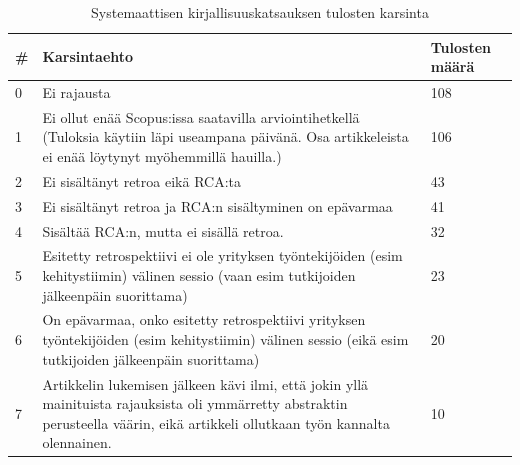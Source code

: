 \begin{table}
    \begin{tabular}{|p{0.5cm}|p{11.5cm}|p{2cm}|}
        \hline
        \textbf{\#} & \textbf{Karsintaehto} & \textbf{Tulosten määrä} \\ \hline
        0 & Ei rajausta                                                                                                                                               & 108            \\ \hline
        1 & Ei ollut enää Scopus:issa saatavilla arviointihetkellä (Tuloksia käytiin läpi useampana päivänä. Osa artikkeleista ei enää löytynyt myöhemmillä hauilla.) & 106            \\ \hline
        2 & Ei sisältänyt retroa eikä RCA:ta                                                                                                                          & 43             \\ \hline
        3 & Ei sisältänyt retroa ja RCA:n sisältyminen on epävarmaa                                                                                                   & 41             \\ \hline
        4 & Sisältää RCA:n, mutta ei sisällä retroa.                                                                                                                  & 32             \\ \hline
        5 & Esitetty retrospektiivi ei ole yrityksen työntekijöiden (esim kehitystiimin) välinen sessio (vaan esim tutkijoiden jälkeenpäin suorittama)                & 23             \\ \hline
        6 & On epävarmaa, onko esitetty retrospektiivi yrityksen työntekijöiden (esim kehitystiimin) välinen sessio (eikä esim tutkijoiden jälkeenpäin suorittama)    & 20             \\
        \hline
        7 & Artikkelin lukemisen jälkeen kävi ilmi, että jokin yllä mainituista rajauksista oli ymmärretty abstraktin perusteella väärin, eikä artikkeli ollutkaan työn kannalta olennainen. & 10 \\ \hline
    \end{tabular}
    \caption{Systemaattisen kirjallisuuskatsauksen tulosten karsinta}
    \label{tab:karsintaehdot_taulukko}
\end{table}

